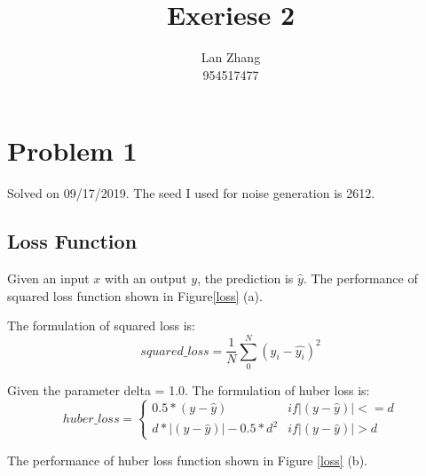 \documentclass{article}
\title{Exeriese 2}
\author{%
  Lan Zhang\\
  954517477\\
}
\begin{document}
\maketitle

\section{Problem 1}

Solved on 09/17/2019. The seed I used for noise generation is 2612. 

\subsection{Loss Function}

Given an input $x$ with an output $y$, the prediction is $\hat{y}$. The performance of squared loss function shown in Figure\ref{loss} (a). 


The formulation of squared loss is:
$$squared\_loss = \frac{1}{N}\sum_0^N{(y_i - \hat{y_i})^2}$$

Given the parameter delta = 1.0. The formulation of huber loss is:
$$huber\_loss = \left\{\begin{matrix}
0.5 *  (y - \hat{y})          & if |(y - \hat{y})| <= d\\ 
d*|(y - \hat{y})| - 0.5 * d^2 & if |(y - \hat{y})| >  d
\end{matrix}\right.$$

The performance of huber loss function shown in Figure \ref{loss} (b). 
\end{document}
